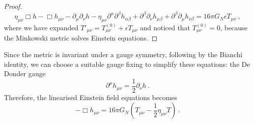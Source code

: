 \begin{proof}
\begin{equation*}
        \end{equation*}
        \begin{equation*}
            \eta_{\mu\nu} \Box h - \Box h_{\mu\nu} - \partial_\mu \partial_\nu h - \eta_{\mu\nu} \partial^\alpha \partial^\beta h_{\alpha\beta}  + \partial^\beta \partial_\nu h_{\mu\beta} + \partial^\beta \partial_\mu h_{\nu\beta} = 16 \pi G_N \epsilon T_{\mu\nu} ~,
        \end{equation*}
        where we have expanded ${T'}_{\mu\nu} = T^{(0)}_{\mu\nu} + \epsilon T_{\mu\nu}$ and noticed that $T_{\mu\nu}^{(0)} = 0$, because the Minkowski metric solves Einstein equations. 
    \end{proof}

    Since the metric is invariant under a gauge symmetry, following by the Bianchi identity, we can choose a suitable gauge fixing to simplify these equations: the De Donder gauge 
    \begin{equation*}
        \partial^\mu h_{\mu\nu} = \frac{1}{2} \partial_\nu h ~.
    \end{equation*}
    Therefore, the linearised Einstein field equations becomes
    \begin{equation*}
        - \Box h_{\mu\nu} = 16 \pi G_N (T_{\mu\nu} - \frac{1}{2} \eta_{\mu\nu} T) ~.
    \end{equation*}
